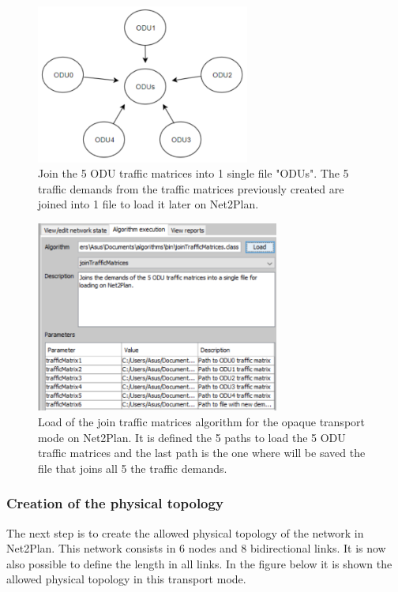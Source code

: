 \begin{figure}[H]
\centering
\includegraphics[width=7cm]{sdf/heuristic/opaque_protection/figures/join_matrices_odus}
\caption{Join the 5 ODU traffic matrices into 1 single file "ODUs". The 5 traffic demands from the traffic matrices previously created are joined into 1 file to load it later on Net2Plan.}
\label{join_matrices_odus}
\end{figure}

\begin{figure}[H]
\centering
\includegraphics[width=8cm]{sdf/heuristic/opaque_protection/figures/traffic_matrices}
\caption{Load of the join traffic matrices algorithm for the opaque transport mode on Net2Plan. It is defined the 5 paths to load the 5 ODU traffic matrices and the last path is the one where will be saved the file that joins all 5 the traffic demands.}
\label{traffic_matrices_surv_ref}
\end{figure}

\newpage
\subsubsection{Creation of the physical topology}

\vspace{11pt}
The next step is to create the allowed physical topology of the network in Net2Plan. This network consists in 6 nodes and 8 bidirectional links. It is now also possible to define the length in all links. In the figure below it is shown the allowed physical topology in this transport mode.

